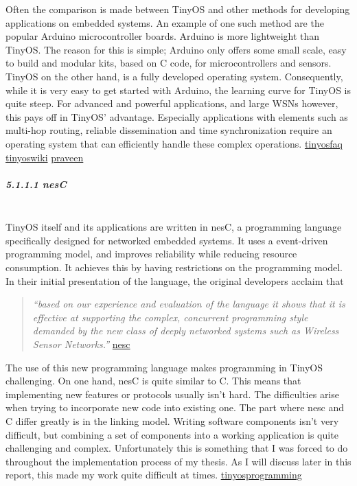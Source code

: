 Often the comparison is made between TinyOS and other methods for
developing applications on embedded systems. An example of one such
method are the popular Arduino microcontroller boards. Arduino is more
lightweight than TinyOS. The reason for this is simple; Arduino only
offers some small scale, easy to build and modular kits, based on C
code, for microcontrollers and sensors. TinyOS on the other hand, is a
fully developed operating system. Consequently, while it is very easy to
get started with Arduino, the learning curve for TinyOS is quite steep.
For advanced and powerful applications, and large WSNs however, this
pays off in TinyOS' advantage. Especially applications with elements
such as multi-hop routing, reliable dissemination and time
synchronization require an operating system that can efficiently handle
these complex operations.
\href{http://tinyos.stanford.edu/tinyos-wiki/index.php/FAQ}{tinyosfaq}
\href{https://en.wikipedia.org/wiki/TinyOS}{tinyoswiki}
\href{http://www.ijcst.com/vol61/1/32-Praveen-Budhwar.pdf}{praveen}

\subparagraph{5.1.1.1 nesC\\\\}\label{nesc}

TinyOS itself and its applications are written in nesC, a programming
language specifically designed for networked embedded systems. It uses a
event-driven programming model, and improves reliability while reducing
resource consumption. It achieves this by having restrictions on the
programming model. In their initial presentation of the language, the
original developers acclaim that

\begin{quote}
\emph{``based on our experience and evaluation of the language it shows
that it is effective at supporting the complex, concurrent programming
style demanded by the new class of deeply networked systems such as
Wireless Sensor Networks.''}
\href{http://www.tinyos.net/papers/nesc.pdf}{nesc}
\end{quote}

The use of this new programming language makes programming in TinyOS
challenging. On one hand, nesC is quite similar to C. This means that
implementing new features or protocols usually isn't hard. The
difficulties arise when trying to incorporate new code into existing
one. The part where nesc and C differ greatly is in the linking model.
Writing software components isn't very difficult, but combining a set of
components into a working application is quite challenging and complex.
Unfortunately this is something that I was forced to do throughout the
implementation process of my thesis. As I will discuss later in this
report, this made my work quite difficult at times.
\href{http://csl.stanford.edu/~pal/pubs/tinyos-programming-1-0.pdf}{tinyosprogramming}

